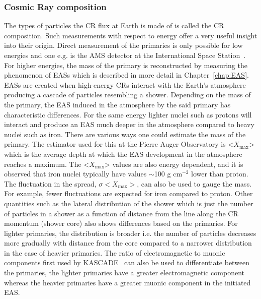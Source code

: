 \subsubsection*{Cosmic Ray composition}
\label{subsubsec:CRcompo}
The types of particles the \gls{CR} flux at Earth is made of is called the \gls*{CR} composition. Such measurements with respect to energy offer a very useful insight into their origin. Direct measurement of the primaries is only possible for low energies and one e.g. is the AMS detector at the International Space Station~\cite{PhysRevLett.110.141102}. For higher energies, the mass of the primary is reconstructed by measuring the phenomenon of \glspl{EAS} which is described in more detail in Chapter~\ref{chap:EAS}. \glspl*{EAS} are created when high-energy \glspl{CR} interact with the Earth's atmosphere producing a cascade of particles resembling a shower.  Depending on the mass of the primary, the \gls{EAS} induced in the atmosphere by the said primary has characteristic differences. For the same energy lighter nuclei such as protons will interact and produce an \gls{EAS} much deeper in the atmosphere compared to heavy nuclei such as iron. There are various ways one could estimate the mass of the primary. The estimator used for this at the Pierre Auger Observatory is <$X_{\text{max}}$> which is the average depth at which the \gls{EAS} development in the atmosphere reaches a maximum. The <$X_{\text{max}}$> values are also energy dependent, and it is observed that iron nuclei typically have values $\sim$100 g cm$^{-2}$ lower than proton. The fluctuation in the spread, $\sigma<X_{\text{max}}>$, can also be used to gauge the mass. For example, fewer fluctuations are expected for iron compared to proton. Other quantities such as the lateral distribution of the shower which is just the number of particles in a shower as a function of distance from the line along the CR momentum (shower core) also shows differences based on the primaries. For lighter primaries, the distribution is broader i.e. the number of particles decreases more gradually with distance from the core compared to a narrower distribution in the case of heavier primaries. The ratio of electromagnetic to muonic components first used by KASCADE~\cite{SCHATZ1998151} can also be used to differentiate between the primaries, the lighter primaries have a greater electromagnetic component whereas the heavier primaries have a greater muonic component in the initiated EAS.    

